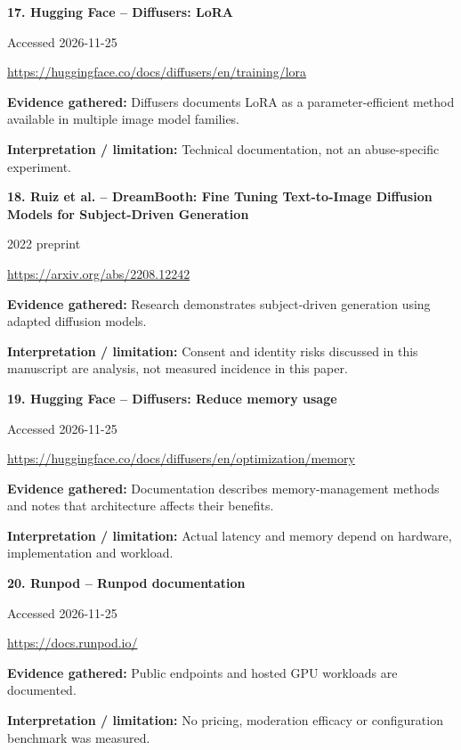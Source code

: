\documentclass[11pt,a4paper]{article}
\begin{document}
\noindent\begin{minipage}{\linewidth}\textbf{17. Hugging Face -- Diffusers: LoRA}\par{\small Accessed 2026-11-25\par\url{https://huggingface.co/docs/diffusers/en/training/lora}}\par
\textbf{Evidence gathered:} Diffusers documents LoRA as a parameter-efficient method available in multiple image model families.\par\textbf{Interpretation / limitation:} Technical documentation, not an abuse-specific experiment.\par
\end{minipage}\par\vspace{2mm}
\noindent\begin{minipage}{\linewidth}\textbf{18. Ruiz et al. -- DreamBooth: Fine Tuning Text-to-Image Diffusion Models for Subject-Driven Generation}\par{\small 2022 preprint\par\url{https://arxiv.org/abs/2208.12242}}\par
\textbf{Evidence gathered:} Research demonstrates subject-driven generation using adapted diffusion models.\par\textbf{Interpretation / limitation:} Consent and identity risks discussed in this manuscript are analysis, not measured incidence in this paper.\par
\end{minipage}\par\vspace{2mm}
\noindent\begin{minipage}{\linewidth}\textbf{19. Hugging Face -- Diffusers: Reduce memory usage}\par{\small Accessed 2026-11-25\par\url{https://huggingface.co/docs/diffusers/en/optimization/memory}}\par
\textbf{Evidence gathered:} Documentation describes memory-management methods and notes that architecture affects their benefits.\par\textbf{Interpretation / limitation:} Actual latency and memory depend on hardware, implementation and workload.\par
\end{minipage}\par\vspace{2mm}
\noindent\begin{minipage}{\linewidth}\textbf{20. Runpod -- Runpod documentation}\par{\small Accessed 2026-11-25\par\url{https://docs.runpod.io/}}\par
\textbf{Evidence gathered:} Public endpoints and hosted GPU workloads are documented.\par\textbf{Interpretation / limitation:} No pricing, moderation efficacy or configuration benchmark was measured.\par
\end{minipage}\par\vspace{2mm}
\end{document}
